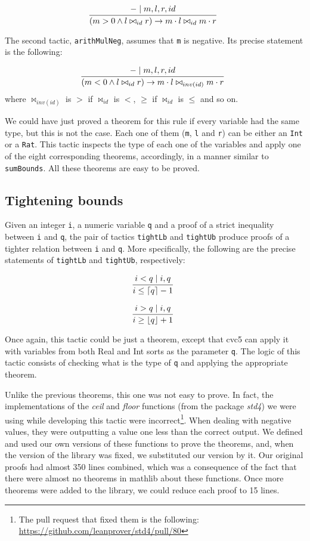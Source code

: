 \[
\infer[]{(m > 0 \wedge l \bowtie_{id} r) \rightarrow m \cdot l \bowtie_{id} m \cdot r}{- \mid m, l, r, id}
\]

The second tactic, \texttt{arithMulNeg}, assumes that \texttt{m} is negative. Its precise statement is the following:

\[
\infer[]{(m < 0 \wedge l \bowtie_{id} r) \rightarrow m \cdot l \bowtie_{inv(id)} m \cdot r}{- \mid m, l, r, id}
\]
where $\bowtie_{inv(id)}$ is $>$ if $\bowtie_{id}$ is $<$, $\ge$ if $\bowtie_{id}$ is $\le$ and so on.

We could have just proved a theorem for this rule if every variable had the
same type, but this is not the case. Each one of them (\texttt{m}, \texttt{l} and \texttt{r}) can be either an \texttt{Int} or a \texttt{Rat}. This tactic inspects
the type of each one of the variables and apply one of the eight corresponding theorems,
accordingly, in a manner similar to \texttt{sumBounds}. All these theorems are
easy to be proved.


\subsection{Tightening bounds}

Given an integer \texttt{i}, a numeric variable \texttt{q} and a proof of a strict inequality
between \texttt{i} and \texttt{q}, the pair of tactics \texttt{tightLb} and \texttt{tightUb} produce proofs of a tighter relation
between \texttt{i} and \texttt{q}. More specifically, the following are the precise
statements of \texttt{tightLb} and \texttt{tightUb}, respectively:

\[
\infer[]{i \le \lceil q \rceil - 1}{i < q \mid i, q}
\]


\[
\infer[]{i \ge \lfloor q \rfloor + 1}{i > q \mid i, q}
\]

Once again, this tactic could be just a theorem, except that cvc5 can apply it
with variables from both Real and Int sorts as the parameter \texttt{q}. The logic
of this tactic consists of checking what is the type of \texttt{q} and applying the
appropriate theorem.

Unlike the previous theorems, this one was not easy to prove.
%
In fact, the implementations of the \textit{ceil} and \textit{floor}
functions (from the package \textit{std4}) we were using while 
developing this tactic were incorrect\footnote{The pull request
that fixed them is the following:
\url{https://github.com/leanprover/std4/pull/80}}.
%
When dealing with negative values, they were outputting a value one
less than the correct output.
%
We defined and used our own versions of these functions to prove the
theorems, and, when the version of the library was fixed, we substituted
our version by it.
%
Our original proofs had almost 350 lines combined, which was a
consequence of the fact that there were almost no theorems in mathlib about these
functions.
%
Once more theorems were added to the library, we could reduce each proof
to 15 lines.

